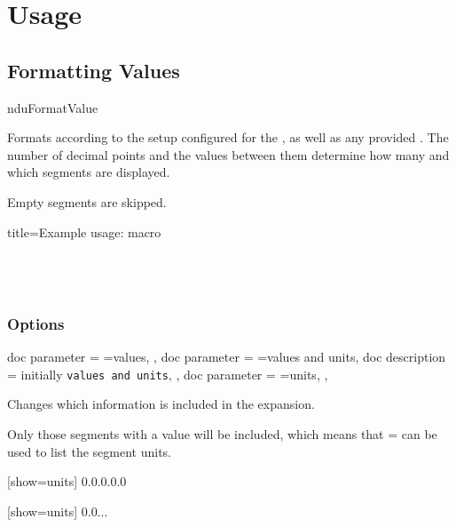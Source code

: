 \documentclass{article}
\begin{document}
\clearpage
\section{Usage} %

\subsection{Formatting Values} %

\begin{docCommand}
	{nduFormatValue}
	{}

Formats  according to the setup configured for the , as well as any provided . The number of decimal points and the values between them determine how many and which segments are displayed.

Empty segments are skipped.
	
\begin{dispExample*}{
	title=Example usage:  macro
}
\\
\\
\\
\\
\end{dispExample*}
\end{docCommand}

\clearpage
\subsubsection{Options}
	
\begin{docKeys}[
		doc name = show,
	]{
		{
			doc parameter = {=values},
		},
		{
			doc parameter = {=values and units},
			doc description = initially \texttt{values and units},
		},
		{
			doc parameter = {=units},
		},
	}

Changes which information is included in the expansion.

Only those segments with a value will be included, which means that = can be used to list the segment units.

\begin{dispExample}
	[show=units]
	{0.0.0.0.0}

	[show=units]
	{0.0...}
\end{dispExample}
\end{docKeys}
\end{document}
